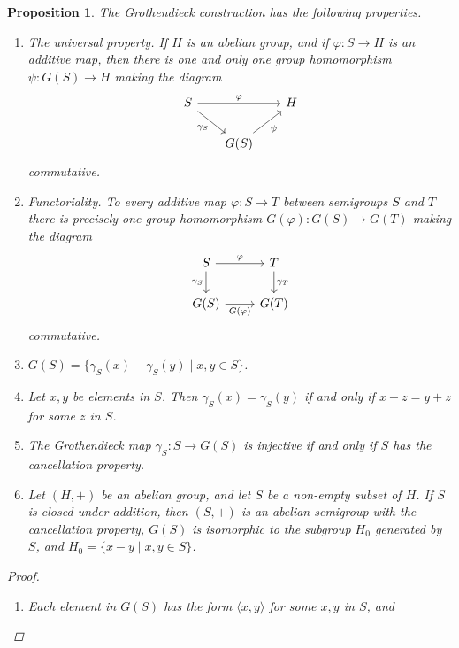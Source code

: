 \documentclass{book}
\newtheorem{proposition}[definition]{Proposition}
\begin{document}
\begin{proposition}\label{prop:613}
  The Grothendieck construction has the following properties.
  \begin{enumerate}
    \item \textnormal{The universal property}. If \(H\) is an abelian group, and if \(\varphi:S\rightarrow H\) is
    an additive map, then there is one and only one group homomorphism \(\psi:G(S)\rightarrow H\) making the diagram
    \begin{equation}\label{UPdiag}
    \begin{tikzcd}[column sep=scriptsize]
    S \arrow{dr}[swap]{\gamma_S} \arrow{rr}{\varphi}
    & & H \\
    & G(S) \arrow{ur}[swap]{\psi}
    \end{tikzcd}
  \end{equation}
    commutative.
    \item \textnormal{Functoriality}. To every additive map \(\varphi:S\rightarrow T\) between
    semigroups \(S\) and \(T\) there is precisely one group homomorphism \(G(\varphi):G(S)\rightarrow G(T)\)
    making the diagram
    \[
    \begin{tikzcd}
    S \arrow[r, "\varphi"] \arrow[d, swap, "\gamma_S"]
    & T \arrow[d, "\gamma_T"] \\
    G(S) \arrow[r, swap, "G(\varphi)"]
    & G(T)
    \end{tikzcd}
    \] 
    commutative.
    \item \(G(S)=\{\gamma_S(x)-\gamma_S(y)\mid x,y\in S\}\).
    \item Let \(x, y\) be elements in \(S\). Then \(\gamma_S(x)=\gamma_S(y)\) if and only if
    \(x+z=y+z\) for some \(z\) in \(S\).
    \item The Grothendieck map \(\gamma_S:S\rightarrow G(S)\) is injective if and only if \(S\) has the cancellation property.
    \item Let \((H,+)\) be an abelian group, and let \(S\) be a non-empty subset of \(H\).
    If \(S\) is closed under addition, then \((S,+)\) is an abelian semigroup with the cancellation property, \(G(S)\) is isomorphic to the
    subgroup \(H_0\) generated by \(S\), and \(H_0=\{x-y\mid x,y\in S\}\).
  \end{enumerate}
  \begin{proof}
    \begin{enumerate}[label=\arabic*.]
      \item[3.] Each element in \(G(S)\) has the form \(\langle x,y\rangle\) for some \(x, y\) in \(S\), and

\end{enumerate}
\end{proof}
\end{proposition}
\end{document}
